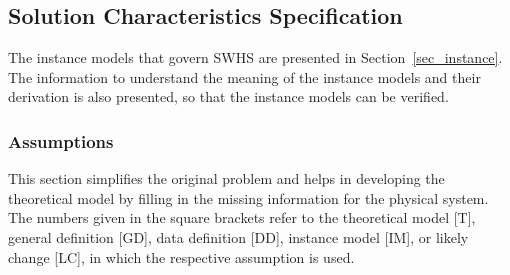 \documentclass[12pt]{article}
\newcommand{\progname}{SWHS}
\begin{document}
\subsection{Solution Characteristics Specification}

The instance models that govern \progname{} are presented in
Section~\ref{sec_instance}.  The information to understand the meaning of the
instance models and their derivation is also presented, so that the instance
models can be verified.

\subsubsection{Assumptions}

This section simplifies the original problem and helps in developing the
theoretical model by filling in the missing information for the physical
system. The numbers given in the square brackets refer to the theoretical model
[T], general definition [GD], data definition [DD], instance model [IM], or
likely change [LC], in which the respective assumption is used.
\end{document}
